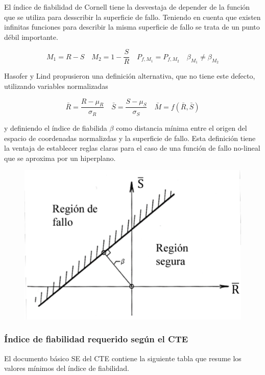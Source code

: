 
El índice de fiabilidad de Cornell tiene la desvestaja de depender de la función que se utiliza para desscribir la superficie de fallo. Teniendo en cuenta que existen infinitas funciones para describir la misma superficie de fallo se trata de un punto débil importante.

\[ M_1 = R - S \quad M_2 = 1 - \frac{S}{R} \quad P_{f, M_1} = P_{f, M_2} \quad \beta_{M_1} \neq \beta_{M_2} \]

Hasofer y Lind propusieron una definición alternativa, que no tiene este defecto, utilizando variables normalizadas

\[ \bar{R} = \frac{R - \mu_R}{\sigma_R} \quad \bar{S} = \frac{S - \mu_S}{\sigma_S} \quad \bar{M} = f(\bar{R}, \bar{S})\]

y definiendo el índice de fiabilida $\beta$ como distancia mínima entre el origen del espacio de coordenadas normalizdas y la superficie de fallo. Esta definición tiene la ventaja de establecer reglas claras para el caso de una función de fallo no-lineal que se aproxima por un hiperplano.

\begin{figure}[H]
    \centering
    \includegraphics[width = 0.5 \textwidth]{Imagenes/Fiabilidad estructural - Region de fallo .png}
\end{figure}


\subsubsection{Índice de fiabilidad requerido según el CTE}
El documento básico SE del CTE contiene la siguiente tabla que resume los valores mínimos del índice de fiabilidad.

